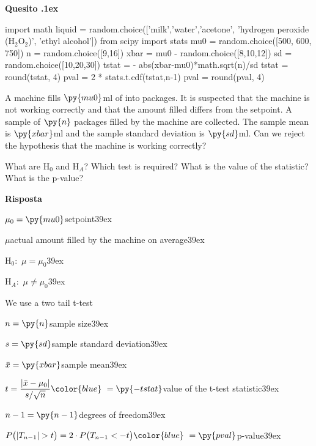 \documentclass[11pt,twoside,a4paper]{article}
\newcounter{quesito}
\newenvironment{question}{\addtocounter{quesito}{1}\par\textbf{Quesito \thequesito.\kern1ex}}{\vspace{0.5\parskip}}
\newenvironment{answer}{\par\textbf{Risposta\quad}}{\vspace{\parskip}}
\begin{document}
\bigskip
\begin{question}
\begin{pycode}
import math
liquid = random.choice(['milk','water','acetone', 'hydrogen peroxide (H$_2$O$_2$)', 'ethyl alcohol'])
from scipy import stats
mu0 = random.choice([500, 600, 750])
n = random.choice([9,16])
xbar = mu0 - random.choice([8,10,12])
sd = random.choice([10,20,30])
tstat = - abs(xbar-mu0)*math.sqrt(n)/sd
tstat = round(tstat, 4)
pval = 2 * stats.t.cdf(tstat,n-1)
pval = round(pval, 4)
\end{pycode}
A machine fills $\py{mu0}$ml of  into packages. It is suspected that the machine is not working correctly and that the amount filled differs from the setpoint. A sample of $\py{n}$ packages filled by the machine are collected. The sample mean is $\py{xbar}$ml and the sample standard deviation is $\py{sd}$ml. Can we reject the hypothesis that the machine is working correctly?

What are H$_0$ and H$_A$? Which test is required? What is the value of the statistic? What is the p-value?

\begin{answer}\parskip5pt

  $\mu_0 = \py{mu0}$\hfill setpoint\kern39ex
  
  $\mu$\hfill actual amount filled by the machine on average\kern39ex

  H$_0:$ $\mu = \mu_0$\kern39ex
  
  H$_A:$ $\mu\neq\mu_0$\kern39ex
  
  We use a two tail t-test
  
  $n = \py{n}$\hfill sample size\kern39ex
  
  $s = \py{sd}$\hfill sample standard deviation\kern39ex
  
  $\bar{x} = \py{xbar}$\hfill sample mean\kern39ex
  
  $t = \displaystyle\frac{|\bar{x}-\mu_0|}{s/\sqrt{n}}{\color{blue}\ = \py{-tstat}}$\hfill value of the t-test statistic\kern39ex
  
  $n-1 = \py{n-1}$\hfill degrees of freedom\kern39ex
  
  $P\big(|T_{n-1}|>t\big) = 2\cdot P\big(T_{n-1}<-t\big){\color{blue}\  = \py{pval}}$\hfill p-value\kern39ex

\end{answer}
\end{question}
\end{document}
